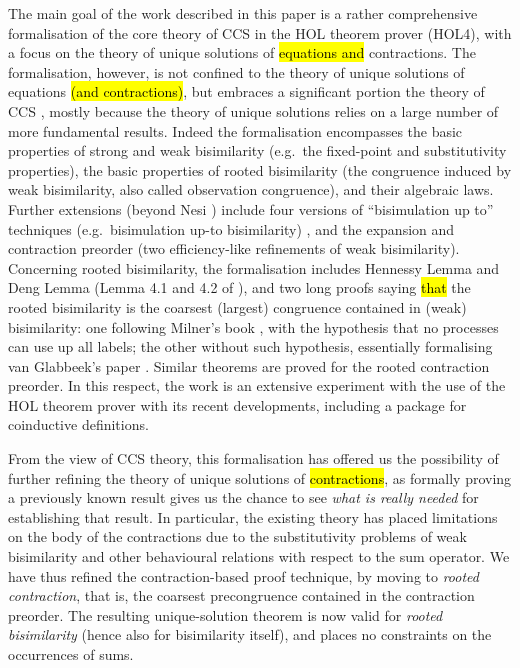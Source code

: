 The main goal of the work described in this paper is a rather
comprehensive formalisation of the core theory of CCS in the HOL
theorem prover (HOL4),  with a focus on the theory of unique solutions
of \hl{equations and} contractions.
The formalisation, however, is not confined to the theory of unique
solutions of equations \hl{(and contractions)}, but embraces a
significant portion the theory of CCS \cite{Mil89}, mostly because the
theory of unique solutions relies on a large number of more fundamental results.
Indeed the formalisation encompasses the basic properties of strong and weak
bisimilarity (e.g.~the fixed-point and substitutivity properties), the
basic properties of
rooted bisimilarity (the congruence induced by weak
bisimilarity, also called observation congruence), and
their algebraic laws. Further extensions (beyond Nesi
\cite{Nesi:1992ve}) include four versions of ``bisimulation up to''
techniques (e.g.~bisimulation up-to bisimilarity) \cite{Mil89,sangiorgi1992problem}, and the
expansion and contraction preorder (two
efficiency-like refinements of weak bisimilarity). Concerning rooted bisimilarity, the formalisation
includes Hennessy Lemma and Deng Lemma (Lemma 4.1 and 4.2 of
\cite{Gorrieri:2015jt}),
 and two long proofs saying \hl{that} the rooted bisimilarity is the coarsest (largest)
 congruence contained in (weak) bisimilarity: one following Milner's
 book \cite{Mil89}, with the hypothesis that no processes can use up
 all labels;
the other without such hypothesis, essentially formalising van Glabbeek's paper \cite{van2005characterisation}.
Similar theorems are proved for the rooted contraction preorder.
In this respect, the work is an extensive experiment with the use of the HOL theorem prover with its
recent developments, including a package for coinductive definitions.

From the view of CCS theory, this formalisation has offered us the possibility of
further refining the theory of unique solutions of \hl{contractions}, as
formally proving a previously known result gives us the
chance to see \emph{what is really needed} for establishing that result.
In particular, the existing theory \cite{sangiorgi2017equations} has
placed limitations on the body of the contractions due to the
substitutivity problems of weak bisimilarity and other behavioural relations with respect
to the sum operator.
We have thus refined the contraction-based proof technique, by moving to  
\emph{rooted contraction}, that is, the coarsest precongruence contained in the contraction
preorder. The resulting unique-solution theorem is now valid for
\emph{rooted bisimilarity} (hence also for bisimilarity itself), and places no 
constraints on the occurrences of sums.


